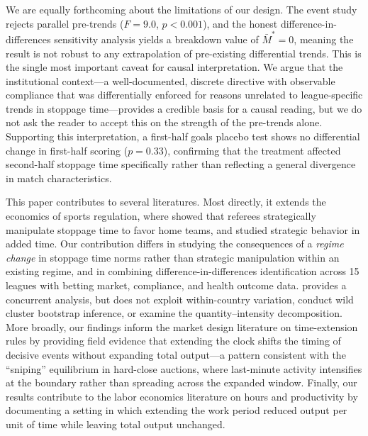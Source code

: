 We are equally forthcoming about the limitations of our design. The event study rejects parallel pre-trends ($F = 9.0$, $p < 0.001$), and the \citet{RambachanRoth2023} honest difference-in-differences sensitivity analysis yields a breakdown value of $\bar{M}^* = 0$, meaning the result is not robust to any extrapolation of pre-existing differential trends. This is the single most important caveat for causal interpretation. We argue that the institutional context---a well-documented, discrete directive with observable compliance that was differentially enforced for reasons unrelated to league-specific trends in stoppage time---provides a credible basis for a causal reading, but we do not ask the reader to accept this on the strength of the pre-trends alone. Supporting this interpretation, a first-half goals placebo test shows no differential change in first-half scoring ($p = 0.33$), confirming that the treatment affected second-half stoppage time specifically rather than reflecting a general divergence in match characteristics.

This paper contributes to several literatures. Most directly, it extends the economics of sports regulation, where \citet{GaricanoEtAl2005} showed that referees strategically manipulate stoppage time to favor home teams, and \citet{ButlerEtAl2026} studied strategic behavior in added time. Our contribution differs in studying the consequences of a \emph{regime change} in stoppage time norms rather than strategic manipulation within an existing regime, and in combining difference-in-differences identification across 15 leagues with betting market, compliance, and health outcome data. \citet{Kocsoy2025} provides a concurrent analysis, but does not exploit within-country variation, conduct wild cluster bootstrap inference, or examine the quantity--intensity decomposition. More broadly, our findings inform the market design literature on time-extension rules \citep{RothOckenfels2002} by providing field evidence that extending the clock shifts the timing of decisive events without expanding total output---a pattern consistent with the ``sniping'' equilibrium in hard-close auctions, where last-minute activity intensifies at the boundary rather than spreading across the expanded window. Finally, our results contribute to the labor economics literature on hours and productivity \citep{Pencavel2015,GoldmanSeskin1983} by documenting a setting in which extending the work period reduced output per unit of time while leaving total output unchanged.

